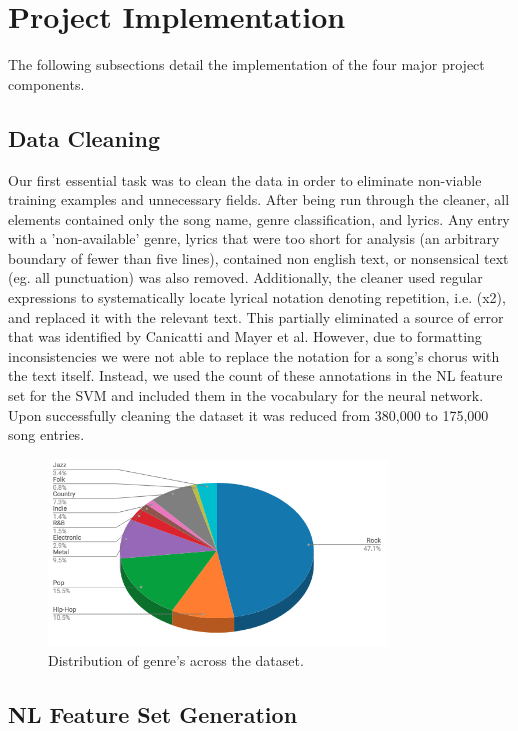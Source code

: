\documentclass[journal]{IEEEtran}
\begin{document}
\section{Project Implementation}
The following subsections detail the implementation of the four major project components. 

\subsection{Data Cleaning}

Our first essential task was to clean the data in order to eliminate non-viable training examples and unnecessary fields. After being run through the cleaner, all elements contained only the song name, genre classification, and lyrics. Any entry with a 'non-available' genre, lyrics that were too short for analysis (an arbitrary boundary of fewer than five lines), contained non english text, or nonsensical text (eg. all punctuation) was also removed. Additionally, the cleaner used regular expressions to systematically locate lyrical notation denoting repetition, i.e. (x2), and replaced it with the relevant text. This partially eliminated a source of error that was identified by Canicatti and Mayer et al. However, due to formatting inconsistencies we were not able to replace the notation for a song's chorus with the text itself. Instead, we used the count of these annotations in the NL feature set for the SVM and included them in the vocabulary for the neural network. Upon successfully cleaning the dataset it was reduced from 380,000 to 175,000 song entries.

\begin{figure}[h]
\centering
\includegraphics[width=9cm]{Figure_1}
\caption{Distribution of genre's across the dataset.}
\end{figure}

\subsection{NL Feature Set Generation}
\end{document}

